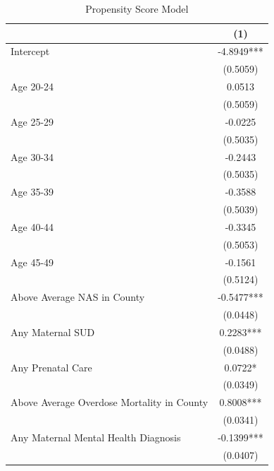\begin{table}[ht]
\footnotesize
\renewcommand{\arraystretch}{1.0}
\centering
\caption{Propensity Score Model}
\begin{tabular}{l c}
\toprule
& (1) \\ \midrule
Intercept                                  & -4.8949*** \\
                                           & (0.5059)   \\
Age 20-24                                  & 0.0513     \\
                                           & (0.5059)   \\
Age 25-29                                  & -0.0225    \\
                                           & (0.5035)   \\
Age 30-34                                  & -0.2443    \\
                                           & (0.5035)   \\
Age 35-39                                  & -0.3588    \\
                                           & (0.5039)   \\
Age 40-44                                  & -0.3345    \\
                                           & (0.5053)   \\
Age 45-49                                  & -0.1561    \\
                                           & (0.5124)   \\
Above Average NAS in County                & -0.5477*** \\
                                           & (0.0448)   \\
Any Maternal SUD                           & 0.2283***  \\
                                           & (0.0488)   \\
Any Prenatal Care                          & 0.0722*    \\
                                           & (0.0349)   \\
Above Average Overdose Mortality in County & 0.8008***  \\
                                           & (0.0341)   \\
Any Maternal Mental Health Diagnosis       & -0.1399*** \\
                                           & (0.0407)   \\

\end{tabular}
\end{table}
